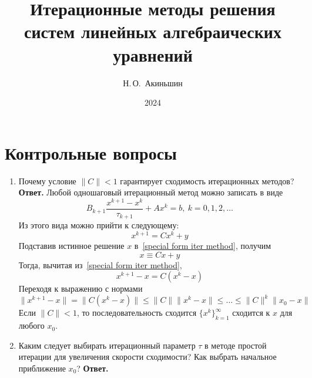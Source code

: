 \documentclass{article}
\title{Итерационные методы решения систем
линейных алгебраических уравнений}
\author{Н.\,О.~Акиньшин}
\date{2024}
\begin{document}
    \maketitle
    \newpage
    \tableofcontents
    \newpage

    \section{Контрольные вопросы}
    \begin{enumerate}
        \item Почему условие $\|C\| < 1$ гарантирует сходимость итерационных методов?
        \newline
        {\bfseries Ответ.}
        Любой одношаговый итерационный метод можно записать в виде 
        \begin{equation*}
            B_{k+1}\frac{x^{k+1} - x^k}{\tau_{k+1}} + A x^k = b, \ k = 0, 1, 2,\ldots
        \end{equation*}
        Из этого вида можно прийти к следующему:
        \begin{equation}
            x^{k+1} = Cx^k + y
            \label{special form iter method}
        \end{equation}
        Подставив истинное решение $x$ в~\eqref{special form iter method},
        получим 
        \begin{equation*}
            x \equiv  Cx + y 
        \end{equation*}
        Тогда, вычитая из~\eqref{special form iter method},
        \begin{equation*}
            x^{k+1} - x = C(x^{k} - x)
        \end{equation*}
        Переходя к выражению с нормами
        \begin{equation*}
            \|x^{k+1} - x\| = \|C(x^{k} - x)\| \leqslant
           \|C\| \|x^{k} - x\| \leqslant \ldots \leqslant \|C\|^{k}\|x_0 - x\|
        \end{equation*}
        Если $\|C\| < 1$, то последовательность сходится $\{x^k\}_{k=1}^\infty$ сходится к $x$ для 
        любого $x_0$.

        
        \item Каким следует выбирать итерационный параметр $\tau$ в методе 
        простой итерации для увеличения скорости сходимости?
        Как выбрать начальное приближение $x_0$?
        \newline
        {\bfseries Ответ.}


\end{enumerate}
\end{document}
